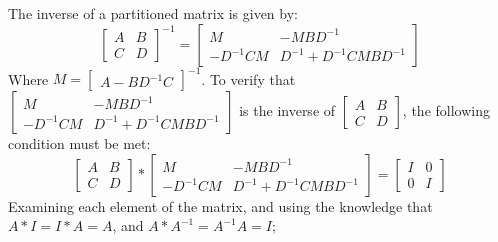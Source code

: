 \documentclass[a4paper, 11pt]{article}
\begin{document}
The inverse of a partitioned matrix is given by:
$$
\begin{bmatrix}
    A & B \\
    C & D
\end{bmatrix}^{-1}
= \begin{bmatrix}
    M & -MBD^{-1} \\
    -D^{-1}CM & D^{-1} + D^{-1}CMBD^{-1}
\end{bmatrix}
    $$
Where $M = \begin{bmatrix}
    A - BD^{-1}C
\end{bmatrix}^{-1}$. To verify that $\begin{bmatrix}
    M & -MBD^{-1} \\
    -D^{-1}CM & D^{-1} + D^{-1}CMBD^{-1}
\end{bmatrix}$ is the inverse of $\begin{bmatrix}
    A & B \\
    C & D
\end{bmatrix}$, the following condition must be met:
$$
\begin{bmatrix}
    A & B \\
    C & D
\end{bmatrix} * 
\begin{bmatrix}
    M & -MBD^{-1} \\
    -D^{-1}CM & D^{-1} + D^{-1}CMBD^{-1}
\end{bmatrix}
= \begin{bmatrix}
    I & 0 \\
    0 & I
\end{bmatrix}$$
Examining each element of the matrix, and using the knowledge that $A*I = I*A = A$, and $A*A^{-1} = A^{-1}A = I$;
\end{document}
